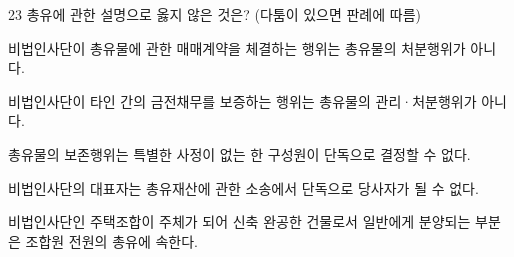 \begin{question}{23}
총유에 관한 설명으로 옳지 않은 것은? (다툼이 있으면 판례에 따름)
\begin{choices}
  \item 비법인사단이 총유물에 관한 매매계약을 체결하는 행위는 총유물의 처분행위가 아니다.
  \item 비법인사단이 타인 간의 금전채무를 보증하는 행위는 총유물의 관리·처분행위가 아니다.
  \item 총유물의 보존행위는 특별한 사정이 없는 한 구성원이 단독으로 결정할 수 없다.
  \item 비법인사단의 대표자는 총유재산에 관한 소송에서 단독으로 당사자가 될 수 없다.
  \item 비법인사단인 주택조합이 주체가 되어 신축 완공한 건물로서 일반에게 분양되는 부분은 조합원 전원의 총유에 속한다.
\end{choices}
\end{question}
